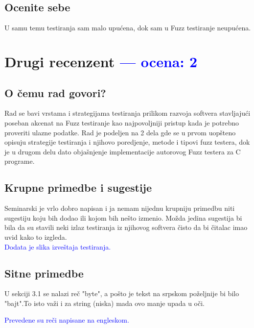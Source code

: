 \documentclass[a4paper]{report}
\newcommand{\odgovor}[1]{\textcolor{blue}{#1}}
\begin{document}
\section{Ocenite sebe}
U samu temu testiranja sam malo upućena, dok sam u Fuzz testiranje neupućena.


\chapter{Drugi recenzent \odgovor{--- ocena: 2} }
\section{O čemu rad govori?}

Rad se bavi vrstama i strategijama testiranja prilikom razvoja softvera stavljajući poseban akcenat na Fuzz testiranje kao najpovoljniji pristup kada je potrebno proveriti ulazne podatke. Rad je podeljen na 2 dela gde se u prvom uopšteno opisuju strategije testiranja i njihovo poredjenje, metode i tipovi fuzz testera, dok je u drugom delu dato objašnjenje implementacije autorovog Fuzz testera za C programe. 

\section{Krupne primedbe i sugestije}
Seminarski je vrlo dobro napisan i ja nemam nijednu krupniju primedbu niti sugestiju koju bih dodao ili kojom bih nešto izmenio. Možda jedina sugestija bi bila da su stavili neki izlaz testiranja  iz njihovog softvera čisto da bi čitalac imao uvid kako to izgleda. \\
\odgovor {
Dodata je slika izveštaja testiranja.
}
\section{Sitne primedbe}
U sekciji 3.1 se nalazi reč "byte", a pošto je tekst na srpskom poželjnije bi bilo "bajt".To isto važi i za string (niska) mada ovo manje upada u oči. 

\odgovor {
Prevedene su reči napisane na engleskom.
}
\\
\end{document}
